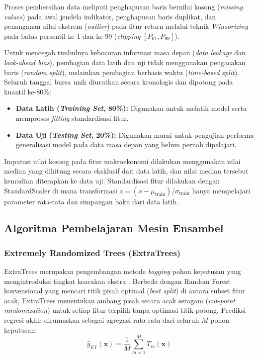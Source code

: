 \documentclass[10pt,a4paper]{article}
\begin{document}
Proses pembersihan data meliputi penghapusan baris bernilai kosong (\textit{missing values}) pada awal jendela indikator, penghapusan baris duplikat, dan penanganan nilai ekstrem (\textit{outlier}) pada fitur return melalui teknik \textit{Winsorizing} pada batas persentil ke-1 dan ke-99 (\textit{clipping} $[P_{01}, P_{99}]$).

Untuk mencegah timbulnya kebocoran informasi masa depan (\textit{data leakage} dan \textit{look-ahead bias}), pembagian data latih dan uji tidak menggunakan pengacakan baris (\textit{random split}), melainkan pembagian berbasis waktu (\textit{time-based split}). Seluruh tanggal bursa unik diurutkan secara kronologis dan dipotong pada kuantil ke-80\%:
\begin{itemize}
  \item \textbf{Data Latih (\textit{Training Set}, 80\%):} Digunakan untuk melatih model serta memproses \textit{fitting} standardisasi fitur.
  \item \textbf{Data Uji (\textit{Testing Set}, 20\%):} Digunakan murni untuk pengujian performa generalisasi model pada data masa depan yang belum pernah dipelajari.
\end{itemize}
Imputasi nilai kosong pada fitur makroekonomi dilakukan menggunakan nilai median yang dihitung secara eksklusif dari data latih, dan nilai median tersebut kemudian diterapkan ke data uji. Standardisasi fitur dilakukan dengan $\text{StandardScaler}$ di mana transformasi $z = (x - \mu_{\text{train}}) / \sigma_{\text{train}}$ hanya mempelajari parameter rata-rata dan simpangan baku dari data latih.

\subsection{Algoritma Pembelajaran Mesin Ensambel}

\subsubsection{Extremely Randomized Trees (ExtraTrees)}
ExtraTrees merupakan pengembangan metode \textit{bagging} pohon keputusan yang mengintroduksi tingkat keacakan ekstra \cite{geurts2011}. Berbeda dengan Random Forest konvensional yang mencari titik pisah optimal (\textit{best split}) di antara subset fitur acak, ExtraTrees menentukan ambang pisah secara acak seragam (\textit{cut-point randomization}) untuk setiap fitur terpilih tanpa optimasi titik potong. Prediksi regresi akhir dirumuskan sebagai agregasi rata-rata dari seluruh $M$ pohon keputusan:
\begin{equation}
  \hat{y}_{\text{ET}}(\mathbf{x}) = \frac{1}{M} \sum_{m=1}^M T_m(\mathbf{x})
  \label{eq:extratrees}
\end{equation}
\end{document}
